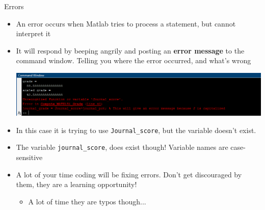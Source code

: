 {}\documentclass[letterpaper,
compress,
xcolor=x11names,
]{beamer}
\begin{document}
\begin{frame}{Errors}
	\footnotesize
	\begin{itemize}
		\item An error occurs when Matlab tries to process a statement, but cannot interpret it
		\item It will respond by beeping angrily and posting an \textbf{error message} to the command window. Telling you where the error occurred, and what's wrong
		\begin{center}
		\includegraphics[width = \linewidth]{error_message.png}
		\end{center}
		\item In this case it is trying to use \texttt{Journal\_score}, but the variable doesn't exist.
		\item The variable \texttt{journal\_score}, does exist though! Variable names are case-sensitive
		\item A lot of your time coding will be fixing errors. Don't get discouraged by them, they are a learning opportunity!
		\begin{itemize}
			\item A lot of time they are typos though...
		\end{itemize}
	\end{itemize}
\end{frame}

\end{document}
